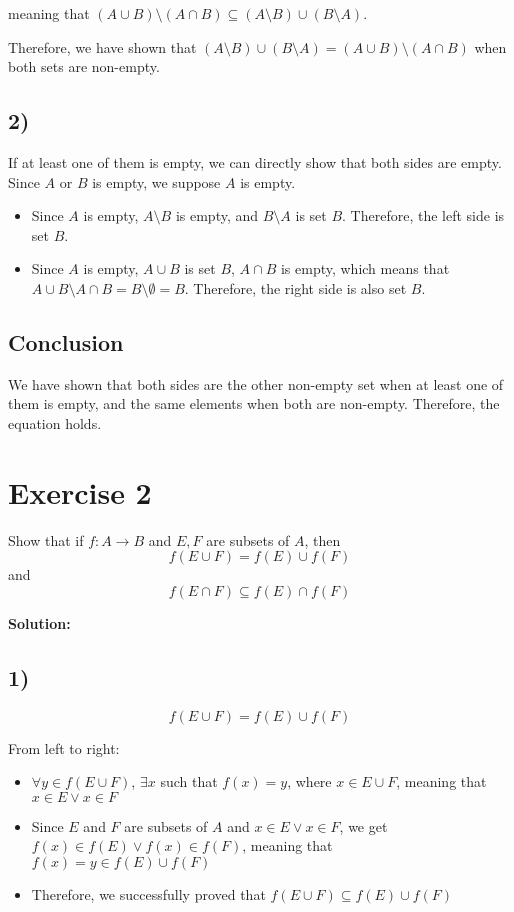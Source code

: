 \documentclass{article}
\begin{document}
meaning that $(A \cup B) \setminus (A \cap B) \subseteq (A \setminus B) \cup (B \setminus A)$.

Therefore, we have shown that $(A \setminus B) \cup (B \setminus A) = (A \cup B) \setminus (A \cap B)$ when both sets are non-empty.

\subsection*{2)}

If at least one of them is empty, we can directly show that both sides are empty. Since $A$ or $B$ is empty, we suppose $A$ is empty.

\begin{itemize}
\item Since $A$ is empty, $A \setminus B$ is empty, and $B \setminus A$ is set $B$. Therefore, the left side is set $B$.
\item Since $A$ is empty, $A \cup B$ is set $B$, $A \cap B$ is empty, which means that $A \cup B \setminus A \cap B = B \setminus \emptyset = B$. Therefore, the right side is also set $B$.
\end{itemize}

\subsection*{Conclusion}

We have shown that both sides are the other non-empty set when at least one of them is empty, and the same elements when both are non-empty. Therefore, the equation holds.

\newpage

\section*{Exercise 2}

Show that if $f: A \to B$ and $E, F$ are subsets of $A$, then
$$
f(E \cup F) = f(E) \cup f(F)
$$
and
$$
f(E \cap F) \subseteq f(E) \cap f(F)
$$

\textbf{Solution:}

\subsection*{1)}

$$f(E \cup F) = f(E) \cup f(F)$$

From left to right:

\begin{itemize}
    \item $\forall y \in f(E \cup F)$, $\exists x$ such that $f(x) = y$, where $x \in E \cup F$, meaning that $x \in E \lor x \in F$
    \item Since $E$ and $F$ are subsets of $A$ and $x \in E \lor x \in F$, we get $f(x) \in f(E) \lor f(x) \in f(F)$, meaning that $f(x) = y \in f(E) \cup f(F)$
    \item Therefore, we successfully proved that $f(E \cup F) \subseteq f(E) \cup f(F)$
\end{itemize}
\end{document}
